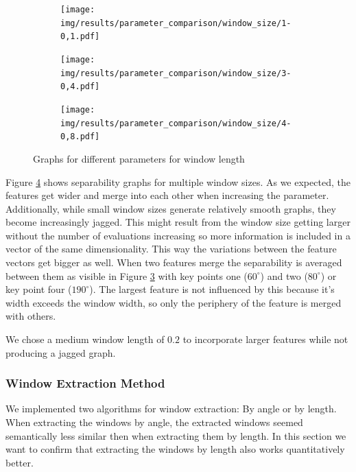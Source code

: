 \documentclass[pdftex,12pt,a4paper]{report}
\begin{document}
\begin{figure}[h]
	\centering
	\begin{subfigure}[b]{0.32\textwidth}
		\centering
		\texttt{[image: img/results/parameter\_comparison/window\_size/1-0,1.pdf]}
		\label{fig:window-size-0}
	\end{subfigure}
	\begin{subfigure}[b]{0.32\textwidth}
		\centering
		\texttt{[image: img/results/parameter\_comparison/window\_size/3-0,4.pdf]}
		\label{fig:window-size-1}
	\end{subfigure}
	\begin{subfigure}[b]{0.32\textwidth}
		\centering
		\texttt{[image: img/results/parameter\_comparison/window\_size/4-0,8.pdf]}
		\label{fig:window-size-2}
	\end{subfigure}
	\caption{Graphs for different parameters for window length}
	\label{fig:window-size}
\end{figure}

Figure \ref{fig:window-size} shows separability graphs for multiple window sizes. As we expected, the features get wider and merge into each other when increasing the parameter. Additionally, while small window sizes generate relatively smooth graphs, they become increasingly jagged. This might result from the window size getting larger without the number of evaluations increasing so more information is included in a vector of the same dimensionality. This way the variations between the feature vectors get bigger as well. When two features merge the separability is averaged between them as visible in Figure \ref{fig:window-size-2} with key points one ($60^\circ$) and two ($80^\circ$) or key point four ($190^\circ$). The largest feature is not influenced by this because it's width exceeds the window width, so only the periphery of the feature is merged with others.

We chose a medium window length of $0.2$ to incorporate larger features while not producing a jagged graph.

\subsubsection{Window Extraction Method}

We implemented two algorithms for window extraction: By angle or by length. When extracting the windows by angle, the extracted windows seemed semantically less similar then when extracting them by length. In this section we want to confirm that extracting the windows by length also works quantitatively better.
\end{document}
